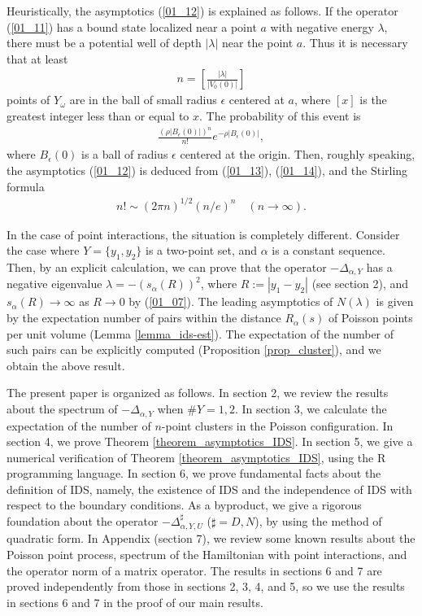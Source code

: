 \documentclass[12pt,a4paper]{article}
\begin{document}
Heuristically, the asymptotics (\ref{01_12}) is explained as follows.
If the operator (\ref{01_11})
has a bound state localized near a point $a$ 
with negative energy $\lambda$,
there must be a potential well
of depth $|\lambda|$ near the point $a$.
Thus it is necessary that at least
\begin{align}
\label{01_13}
 n=\left[\frac{|\lambda|}{|V_0(0)|}\right]
\end{align}
points of $Y_\omega$ are in the ball of small radius $\epsilon$
centered at $a$,
where $[x]$ is the greatest integer less than or equal to $x$.
The probability of this event is
\begin{align}
\label{01_14}
 \frac{(\rho |B_\epsilon(0)|)^n}{n!}e^{-\rho|B_\epsilon(0)|},
\end{align}
where $B_\epsilon(0)$ is a ball of radius $\epsilon$
centered at the origin.
Then, roughly speaking,
the asymptotics (\ref{01_12}) is deduced from
(\ref{01_13}), (\ref{01_14}), and
the Stirling formula 
\begin{align*}
 n!  \sim (2\pi n)^{1/2}\left({n}/{e}\right)^n\quad
(n \to \infty).
\end{align*}

In the case of point interactions,
the situation is completely different.
Consider the case where $Y=\{y_1,y_2\}$ is a two-point set,
and $\alpha$ is a constant sequence.
Then, 
by an explicit calculation,
we can prove that the operator $-\Delta_{\alpha,Y}$ has a negative eigenvalue
$\lambda = -(s_\alpha(R))^2$,
where $R:=|y_1-y_2|$ (see section 2),
and $s_\alpha(R)\to \infty$ as $R\to 0$
by (\ref{01_07}).
The leading asymptotics of $N(\lambda)$ is given by the expectation number
of pairs within the distance $R_{\alpha}(s)$ of
Poisson points per unit volume
(Lemma \ref{lemma_ids-est}).
The expectation of the number of such pairs
can be explicitly computed
(Proposition \ref{prop_cluster}),
and we obtain the above result.

The present paper is organized as follows.
In section 2,
we review the results about 
the spectrum of $-\Delta_{\alpha,Y}$ when $\# Y=1,2$.
In section 3,
we calculate the expectation of the number of $n$-point clusters
in the Poisson configuration.
In section 4, we prove Theorem \ref{theorem_asymptotics_IDS}.
In section 5, we give a numerical verification of Theorem \ref{theorem_asymptotics_IDS}, using the R programming language.
In section 6,
we prove fundamental facts about the definition of IDS,
namely, the existence of IDS and the independence of IDS
with respect to the boundary conditions.
As a byproduct, we give a rigorous foundation
about the operator $-\Delta^\sharp_{\alpha,Y,U}$
($\sharp=D,N$), by using the method of quadratic form.
In Appendix (section 7),
we review some known results about
the Poisson point process,
spectrum of the Hamiltonian with point interactions,
and the operator norm of a matrix operator.
The results in sections 6 and 7 are proved independently from
those in sections 2, 3, 4, and 5,
so we use the results in sections 6 and 7 in the proof of our main results.
\end{document}
